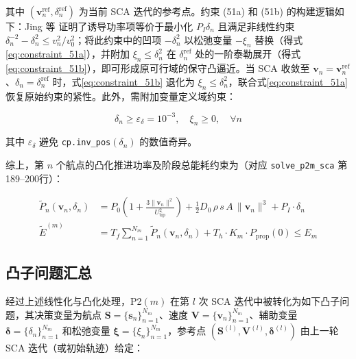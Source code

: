 其中 $(\mathbf{v}_n^{\mathrm{ref}},\delta_n^{\mathrm{ref}})$ 为当前 SCA 迭代的参考点。约束 (51a) 和 (51b) 的构建逻辑如下：Jing 等\cite{Jing2022} 证明了诱导功率项等价于最小化 $P_I\delta_n$ 且满足非线性约束 $\delta_n^{-2}-\delta_n^2\leq v_n^2/v_0^2$；将此约束中的凹项 $-\delta_n^2$ 以松弛变量 $-\xi_n$ 替换（得式\eqref{eq:constraint_51a}），并附加 $\xi_n\leq\delta_n^2$ 在 $\delta_n^{\mathrm{ref}}$ 处的一阶泰勒展开（得式\eqref{eq:constraint_51b}），即可形成原可行域的保守凸逼近。当 SCA 收敛至 $\mathbf{v}_n=\mathbf{v}_n^{\mathrm{ref}}$、$\delta_n=\delta_n^{\mathrm{ref}}$ 时，式\eqref{eq:constraint_51b} 退化为 $\xi_n\leq\delta_n^2$，联合式\eqref{eq:constraint_51a} 恢复原始约束的紧性。此外，需附加变量定义域约束：

\begin{equation}
\delta_n\geq\varepsilon_{\delta}=10^{-3},\quad \xi_n\geq 0,\quad\forall n
\label{eq:delta_xi_bounds}
\end{equation}

其中 $\varepsilon_{\delta}$ 避免 \texttt{cp.inv\_pos}$(\delta_n)$ 的数值奇异。

综上，第 $n$ 个航点的凸化推进功率及阶段总能耗约束为（对应 \texttt{solve\_p2m\_sca} 第189--200行）：

\begin{align}
\widetilde{P}_n(\mathbf{v}_n,\delta_n)&=
P_0\!\left(1+\frac{3\|\mathbf{v}_n\|^2}{U_{\mathrm{tip}}^2}\right)
+\frac{1}{2}D_0\,\rho\,s\,A\,\|\mathbf{v}_n\|^3
+P_I\cdot\delta_n\\
\widetilde{E}^{(m)}&=T_f\sum_{n=1}^{N_m}\widetilde{P}_n(\mathbf{v}_n,\delta_n)+
T_h\cdot K_m\cdot P_{\mathrm{prop}}(0)\leq E_m
\label{eq:energy_convex_full}
\end{align}

\subsection{凸子问题汇总}

经过上述线性化与凸化处理，P2$(m)$ 在第 $l$ 次 SCA 迭代中被转化为如下凸子问题，其决策变量为航点 $\mathbf{S}=\{\mathbf{s}_n\}_{n=1}^{N_m}$、速度 $\mathbf{V}=\{\mathbf{v}_n\}_{n=1}^{N_m}$、辅助变量 $\bm{\delta}=\{\delta_n\}_{n=1}^{N_m}$ 和松弛变量 $\bm{\xi}=\{\xi_n\}_{n=1}^{N_m}$，参考点 $(\mathbf{S}^{(l)},\mathbf{V}^{(l)},\bm{\delta}^{(l)})$ 由上一轮 SCA 迭代（或初始轨迹）给定：

